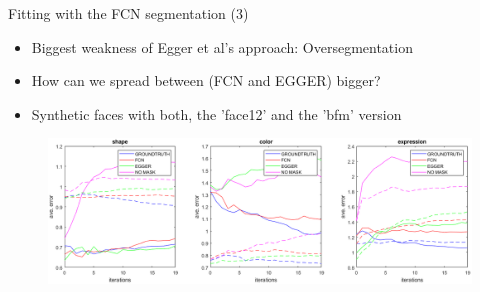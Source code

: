 \documentclass{beamer}
\begin{document}
\begin{frame}[c]{Fitting with the FCN segmentation (3)}
	\begin{itemize}
		\item Biggest weakness of Egger et al's approach: Oversegmentation
		\item How can we spread between (FCN and EGGER) bigger?
		\item Synthetic faces with both, the 'face12' and the 'bfm' version
	\end{itemize}
	
	\begin{figure}
		\includegraphics[width=1.05\textwidth]{chap3_setting2/plot_hands_setting2.png}
	\end{figure}
\end{frame}

%			
%			
%			
\end{document}
